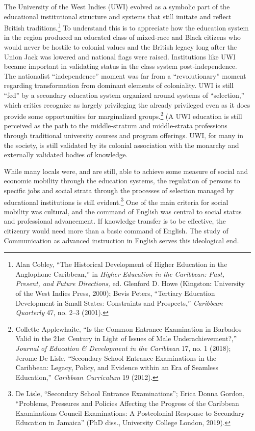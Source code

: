 \documentclass{tufte-handout}
\begin{document}
The University of the West Indies (UWI) evolved as a symbolic part of
the educational institutional structure and systems that still imitate
and reflect British traditions.\footnote{Alan Cobley, ``The Historical
  Development of Higher Education in the Anglophone Caribbean,'' in
  \emph{Higher Education in the Caribbean: Past, Present, and Future
  Directions,} ed. Glenford D. Howe (Kingston: University of the West
  Indies Press, 2000); Bevis Peters, ``Tertiary Education Development in
  Small States: Constraints and Prospects,'' \emph{Caribbean Quarterly}
  47, no. 2--3 (2001).} To understand this is to appreciate how the
education system in the region produced an educated class of mixed-race
and Black citizens who would never be hostile to colonial values and the
British legacy long after the Union Jack was lowered and national flags
were raised. Institutions like UWI became important in validating status
in the class system post-independence. The nationalist ``independence''
moment was far from a ``revolutionary'' moment regarding transformation
from dominant elements of coloniality. UWI is still ``fed'' by a
secondary education system organized around systems of ``selection,''
which critics recognize as largely privileging the already privileged
even as it does provide some opportunities for marginalized
groups.\footnote{Collette Applewhaite, ``Is the Common Entrance
  Examination in Barbados Valid in the 21st Century in Light of Issues
  of Male Underachievement?,'' \emph{Journal of Education \& Development
  in the Caribbean} 17, no. 1 (2018); Jerome De Lisle, ``Secondary
  School Entrance Examinations in the Caribbean: Legacy, Policy, and
  Evidence within an Era of Seamless Education,'' \emph{Caribbean
  Curriculum} 19 (2012).} (A UWI education is still perceived as the
path to the middle-stratum and middle-strata professions through
traditional university courses and program offerings. UWI, for many in
the society, is still validated by its colonial association with the
monarchy and externally validated bodies of knowledge.

While many locals were, and are still, able to achieve some measure of
social and economic mobility through the education systems, the
regulation of persons to specific jobs and social strata through the
processes of selection managed by educational institutions is still
evident.\footnote{De Lisle, ``Secondary School Entrance Examinations'';
  Erica Donna Gordon, ``Problems, Pressures and Policies Affecting the
  Progress of the Caribbean Examinations Council Examinations: A
  Postcolonial Response to Secondary Education in Jamaica'' (PhD diss.,
  University College London, 2019).} One of the main criteria for social
mobility was cultural, and the command of English was central to social
status and professional advancement. If knowledge transfer is to be
effective, the citizenry would need more than a basic command of
English. The study of Communication as advanced instruction in English
serves this ideological end.
\end{document}
